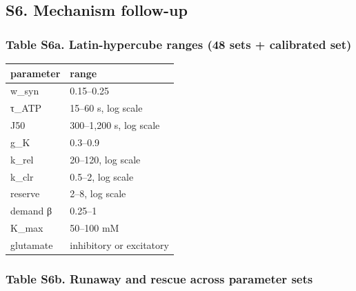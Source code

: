 \documentclass[11pt]{article}
\newcounter{none}
\begin{document}
\subsection{S6. Mechanism follow-up}\label{s6.-mechanism-follow-up}

\subsubsection{Table S6a. Latin-hypercube ranges (48 sets + calibrated set)}\label{table-s6a.-latin-hypercube-ranges-48-sets-calibrated-set}

{\def\LTcaptype{none} %
\begin{longtable}[]{@{}ll@{}}
\toprule\noalign{}
parameter & range \\
\midrule\noalign{}
\endhead
\bottomrule\noalign{}
\endlastfoot
w\_syn & 0.15--0.25 \\
τ\_ATP & 15--60 s, log scale \\
J50 & 300--1,200 s, log scale \\
g\_K & 0.3--0.9 \\
k\_rel & 20--120, log scale \\
k\_clr & 0.5--2, log scale \\
reserve & 2--8, log scale \\
demand β & 0.25--1 \\
K\_max & 50--100 mM \\
glutamate & inhibitory or excitatory \\
\end{longtable}
}

\subsubsection{Table S6b. Runaway and rescue across parameter sets}\label{table-s6b.-runaway-and-rescue-across-parameter-sets}
\end{document}
